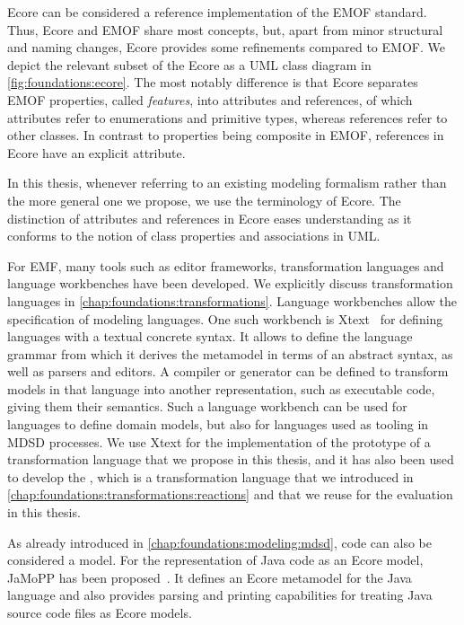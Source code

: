 Ecore can be considered a reference implementation of the \gls{EMOF} standard.
Thus, Ecore and \gls{EMOF} share most concepts, but, apart from minor structural and naming changes, Ecore provides some refinements compared to \gls{EMOF}.
We depict the relevant subset of the Ecore \metametamodel as a \gls{UML} class diagram in \autoref{fig:foundations:ecore}.
The most notably difference is that Ecore separates \gls{EMOF} properties, called \emph{features}, into attributes and references, of which attributes refer to enumerations and primitive types, whereas references refer to other classes.
In contrast to properties being composite in \gls{EMOF}, references in Ecore have an explicit  attribute.

In this thesis, whenever referring to an existing modeling formalism rather than the more general one we propose, we use the terminology of Ecore.
The distinction of attributes and references in Ecore eases understanding as it conforms to the notion of class properties and associations in \gls{UML}.

For \gls{EMF}, many tools such as editor frameworks, transformation languages and language workbenches have been developed.
We explicitly discuss transformation languages in \autoref{chap:foundations:transformations}.
Language workbenches allow the specification of modeling languages.
One such workbench is Xtext~\cite{efftinge2006xtext-MSES,bettini2016Xtext-Book} for defining languages with a textual concrete syntax.
It allows to define the language grammar from which it derives the metamodel in terms of an abstract syntax, as well as parsers and editors.
A compiler or generator can be defined to transform models in that language into another representation, such as executable code, giving them their semantics.
Such a language workbench can be used for languages to define domain models, but also for languages used as tooling in \gls{MDSD} processes.
We use Xtext for the implementation of the prototype of a transformation language that we propose in this thesis, and it has also been used to develop the \reactionslanguage, which is a transformation language that we introduced in \autoref{chap:foundations:transformations:reactions} and that we reuse for the evaluation in this thesis.

As already introduced in \autoref{chap:foundations:modeling:mdsd}, code can also be considered a model.
For the representation of Java code as an Ecore model, JaMoPP has been proposed~\cite{heidenreich2010jamopp-SLE, heidenreich2009jamopp-report}.
It defines an Ecore metamodel for the Java language and also provides parsing and printing capabilities for treating Java source code files as Ecore models.




